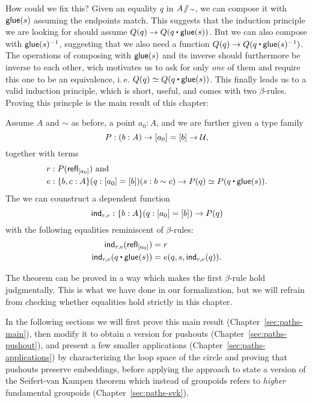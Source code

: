 How could we fix this? Given an equality $q$ in $A \! \sslash \! {\scriptstyle \sim}$, we can compose it
with $\mathsf{glue}(s)$ assuming the endpoints match.
This suggests that the induction principle we are looking for should assume
$Q(q) \to Q(q \ct \glue(s))$.
But we can also compose with $\mathsf{glue}(s)^{-1}$,
suggesting that we also need a function $Q(q)  \to Q(q \ct \glue(s)\inv)$.
The operations of composing with $\mathsf{glue}(s)$ and its inverse should furthermore
be inverse to each other,
wich motivates us to ask for only \emph{one} of them and require this one to be
an equivalence, i.\,e. $Q(q) \simeq Q(q \ct \glue(s))$.
This finally leads us to a valid induction principle, which is short, useful, and
comes with two $\beta$-rules.
Proving this princple is the main result of this chapter:
\begin{thm}
Assume $A$ and $\sim$ as before, a point $a_0 : A$, and we are further given
a type family
\begin{equation*}
P : (b : A) \to [a_0] = [b] \to \mathcal{U} \text{,}
\end{equation*}
together with terms
\begin{align*}
r &: P(\refl_{[a_0]}) \text{ and} \\
e &: \{b, c : A\}(q : [a_0] = [b])(s : b \sim c) \to P(q) \simeq P(q \ct \glue(s)) \text{.}
\end{align*}
The we can counstruct a dependent function
\begin{equation*}
\mathsf{ind}_{r, e} : \{b : A\}(q : [a_0] = [b]) \to P(q)
\end{equation*}
with the following equalities reminiscent of $\beta$-rules:
\begin{align}
\ind_{r,e} (\refl_{[a_0]}) &= r \label{eq:paths-thm-based-first-beta} \\
\ind_{r,e}(q \ct \glue(s)) &= e (q,s, \mathsf{ind}_{r,e}(q)) \label{eq:paths-thm-based-second-beta} \text{.}
\end{align}
\end{thm}

\begin{remark}
The theorem can be proved in a way which makes the first $\beta$-rule hold judgmentally.
This is what we have done in our formalization, but we will refrain from checking
whether equalities hold strictly in this chapter.
\end{remark}

In the following sections we will first prove this main result (Chapter~\ref{sec:paths-main}),
then modify it to obtain a version for pushouts (Chapter~\ref{sec:paths-pushout}),
and present a few smaller applications (Chapter~\ref{sec:paths-applications})
by characterizing the loop space of the circle and proving that
pushouts preserve embeddings,
before applying the approach to state a version of the Seifert-van Kampen theorem
which instead of groupoids refers to \emph{higher} fundamental groupoids
(Chapter~\ref{sec:paths-svk}).


